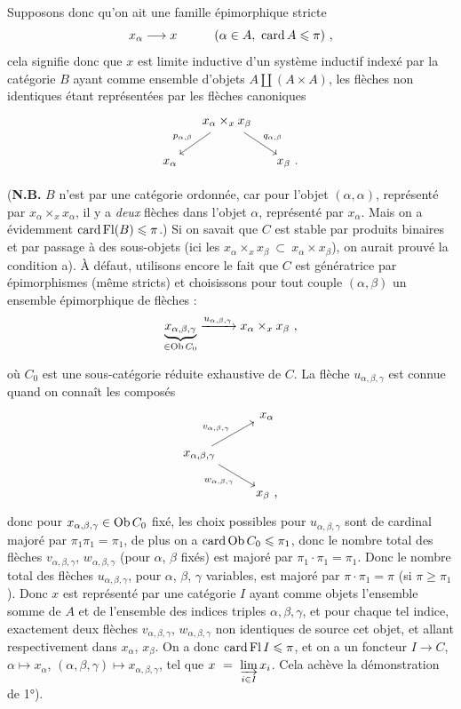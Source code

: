 Supposons donc qu'on ait une famille épimorphique stricte
\[ x_{\alpha} \longrightarrow x \qquad\quad (\alpha \in A,\ \operatorname{card} A \leqslant \pi) \ , \]
cela signifie donc que $x$ est limite inductive d'un système inductif indexé par la catégorie $B$ ayant comme ensemble d'objets $A \amalg (A\times A)$, les flèches non identiques étant représentées par les flèches canoniques
\[
\begin{tikzcd}[column sep=small]
& x_{\alpha} \times_x x_{\beta} \arrow[dl, "p_{\alpha,\beta}"'] \arrow[dr, "q_{\alpha,\beta}"] & \\
x_{\alpha} & & x_{\beta} \text{ .}
\end{tikzcd}
\]

(\textbf{N.B.} $B$ n'est par une catégorie ordonnée, car pour l'objet $(\alpha,\alpha)$, représenté par $x_{\alpha}\times_x x_{\alpha}$, %
il y a \textit{deux} flèches dans l'objet $\alpha$, représenté par $x_{\alpha}$. Mais on a évidemment $\operatorname{card} \operatorname{Fl}(B) \leqslant \pi$.) Si on savait que $C$ est stable par produits binaires et par passage à des sous-objets (ici les $x_{\alpha} \times_x x_{\beta} \ \subset \ x_{\alpha} \times x_{\beta}$), on aurait prouvé la condition a). À défaut, utilisons encore le fait que $C$ est génératrice par épimorphismes (même stricts) et choisissons pour tout couple $(\alpha,\beta)$ un ensemble épimorphique de flèches :
\[ \underbrace{x_{\alpha,\beta,\gamma}}_{\in \mathrm{Ob}\, C_0} \xrightarrow{u_{\alpha,\beta,\gamma}} x_{\alpha} \times_x x_{\beta} \ , \]

où $C_0$ est une sous-catégorie réduite exhaustive de $C$. La flèche $u_{\alpha,\beta,\gamma}$ est connue quand on connaît les composés
\[
\begin{tikzcd}
& x_{\alpha} \\
x_{\alpha,\beta,\gamma} \arrow[ur, "v_{\alpha,\beta,\gamma}"] \arrow[dr, "w_{\alpha,\beta,\gamma}"'] & \\
& x_{\beta} \text{ ,}
\end{tikzcd}
\]
donc pour $x_{\alpha,\beta,\gamma} \in \mathrm{Ob}\, C_0$ fixé, les choix possibles pour $u_{\alpha,\beta,\gamma}$ sont de cardinal majoré par $\pi_1\pi_1 = \pi_1$, de plus on a $\operatorname{card} \mathrm{Ob}\, C_0 \leqslant \pi_1$, donc le nombre total des flèches $v_{\alpha,\beta,\gamma}$, $w_{\alpha,\beta,\gamma}$ (pour $\alpha$, $\beta$ fixés) est majoré par $\pi_1 \cdot \pi_1 = \pi_1$. Donc le nombre total des flèches $u_{\alpha,\beta,\gamma}$, pour $\alpha$, $\beta$, $\gamma$ variables, est majoré par $\pi \cdot \pi_1 = \pi$ (si $\pi \geqslant \pi_1$). Donc $x$ est représenté par une catégorie $I$ ayant comme objets l'ensemble somme de $A$ et de l'ensemble des indices triples $\alpha,\beta,\gamma$, et pour chaque tel indice, exactement deux flèches $v_{\alpha,\beta,\gamma}$, $w_{\alpha,\beta,\gamma}$ non identiques de source cet objet, et allant respectivement dans $x_{\alpha}$, $x_{\beta}$. On a donc $\operatorname{card} \operatorname{Fl} I \leqslant \pi$, et on a un foncteur $I \longrightarrow C$, $\alpha \longmapsto x_{\alpha}$, $(\alpha,\beta,\gamma) \longmapsto x_{\alpha,\beta,\gamma}$, tel que $x \ = \ \varinjlim\limits_{i\in I} x_i$. Cela achève la démonstration de 1°).

